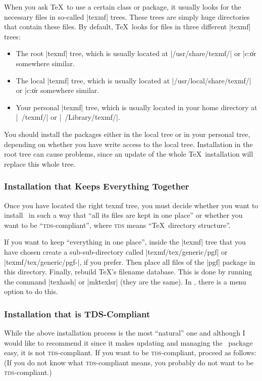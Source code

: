When you ask \TeX\ to use a certain class or package, it usually looks for the
necessary files in so-called |texmf| trees. These trees are simply huge
directories that contain these files. By default, \TeX\ looks for files in
three different |texmf| trees:
%
\begin{itemize}
    \item The root |texmf| tree, which is usually located at
        |/usr/share/texmf/| or |c:\texmf\| or somewhere similar.
    \item The local  |texmf| tree, which is usually located at
        |/usr/local/share/texmf/| or |c:\localtexmf\| or somewhere similar.
    \item Your personal  |texmf| tree, which is usually located in your home
        directory at |~/texmf/| or |~/Library/texmf/|.
\end{itemize}

You should install the packages either in the local tree or in your personal
tree, depending on whether you have write access to the local tree.
Installation in the root tree can cause problems, since an update of the whole
\TeX\ installation will replace this whole tree.


\subsubsection{Installation that Keeps Everything Together}

Once you have located the right texmf tree, you must decide whether you want to
install \pgfname\ in such a way that ``all its files are kept in one place'' or
whether you want to be ``\textsc{tds}-compliant'', where \textsc{tds} means
``\TeX\ directory structure''.

If you want to keep ``everything in one place'', inside the |texmf| tree that
you have chosen create a sub-sub-directory called |texmf/tex/generic/pgf| or
|texmf/tex/generic/pgf-|\texttt{\pgfversion}, if you prefer. Then place all
files of the |pgf| package in this directory. Finally, rebuild \TeX's filename
database. This is done by running the command |texhash| or |mktexlsr| (they are
the same). In , there is a menu option to do this.


\subsubsection{Installation that is TDS-Compliant}

While the above installation process is the most ``natural'' one and although I
would like to recommend it since it makes updating and managing the \pgfname\
package easy, it is not \textsc{tds}-compliant. If you want to be
\textsc{tds}-compliant, proceed as follows: (If you do not know what
\textsc{tds}-compliant means, you probably do not want to be
\textsc{tds}-compliant.)

